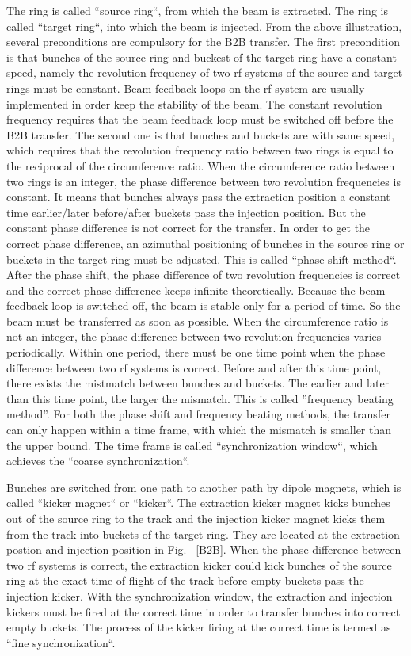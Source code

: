 The ring is called ``source ring``, from which the beam is extracted. The ring is called ``target ring``, into which the beam is injected. From the above illustration, several preconditions are compulsory for the B2B transfer. The first precondition is that bunches of the source ring and buckest of the target ring have a constant speed, namely the revolution frequency of two rf systems of the source and target rings must be constant. Beam feedback loops on the rf system are usually implemented in order keep the stability of the beam. The constant revolution frequency requires that the beam feedback loop must be switched off before the B2B transfer. The second one is that bunches and buckets are with same speed, which requires that the revolution frequency ratio between two rings is equal to the reciprocal of the circumference ratio. When the circumference ratio between two rings is an integer, the phase difference between two revolution frequencies is constant. It means that bunches always pass the extraction position a constant time earlier/later before/after buckets pass the injection position. But the constant phase difference is not correct for the transfer. In order to get the correct phase difference, an azimuthal positioning of bunches in the source ring or buckets in the target ring must be adjusted. This is called  ``phase shift method``. After the phase shift, the phase difference of two revolution frequencies is correct and the correct phase difference keeps infinite theoretically. Because the beam feedback loop is switched off, the beam is stable only for a period of time. So the beam must be transferred as soon as possible. %
When the circumference ratio is not an integer, the phase difference between two revolution frequencies varies periodically. Within one period, there must be one time point when the phase difference between two rf systems is correct. Before and after this time point, there exists the mistmatch between bunches and buckets. The earlier and later than this time point, the larger the mismatch. This is called ''frequency beating method''. For both the phase shift and frequency beating methods, the transfer can only happen within a time frame, with which the mismatch is smaller than the upper bound. The time frame is called ``synchronization window``, which achieves the ``coarse synchronization``.

Bunches are switched from one path to another path by dipole magnets, which is called ``kicker magnet`` or ``kicker``. The extraction kicker magnet kicks bunches out of the source ring to the track and the injection kicker magnet kicks them from the track into buckets of the target ring. They are located at the extraction postion and injection position in Fig. ~\ref{B2B}. When the phase difference between two rf systems is correct, the extraction kicker could kick bunches of the source ring at the exact time-of-flight of the track before empty buckets pass the injection kicker. With the synchronization window, the extraction and injection kickers must be fired at the correct time in order to transfer bunches into correct empty buckets. The process of the kicker firing at the correct time is termed as ``fine synchronization``.

